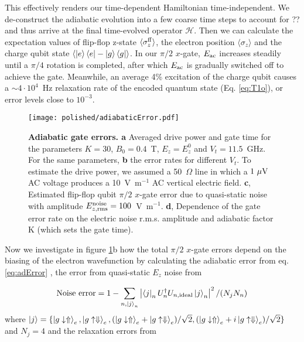 This effectively renders our time-dependent Hamiltonian time-independent. We de-construct the adiabatic evolution into a few coarse time steps to account for ?? and thus arrive at the final time-evolved operator $\mathcal{H}$. Then we can calculate the expectation values of flip-flop z-state $\langle \sigma_z^{\rm ff}\rangle$, the electron position $\langle \sigma_z\rangle$ and the charge qubit state $\langle \ket{e}\bra{e}-\ket{g}\bra{g}\rangle$. 
In our $\pi/2$ $x$-gate, $E_{\rm ac}$ increases steadily until a $\pi/4$ rotation is completed, after which $E_{\rm ac}$ is gradually switched off to achieve the gate. Meanwhile, an average 4\% excitation of the charge qubit causes a $\sim4\cdot 10^4$~Hz relaxation rate of the encoded quantum state (Eq. \ref{eq:T1o}), or error levels close to $10^{-3}$. 

\begin{figure}[h]
	\centering
	\texttt{[image: polished/adiabaticError.pdf]}
	\caption[Adiabatic gate errors]{\textbf{Adiabatic gate errors. a} Averaged drive power and gate time for the parameters $K=30$, $B_0=0.4$~T, $E_z=E_z^0$ and $V_t=11.5$~GHz. For the same parameters, \textbf{b} the error rates for different $V_t$. To estimate the drive power, we assumed a 50~$\Omega$ line in which a $1~{ \mu \rm V}$ AC voltage produces a 10~V~m$^{-1}$ AC vertical electric field.
		\textbf{c}, Estimated flip-flop qubit $\pi/2$ $x$-gate error due to quasi-static noise with amplitude $E_{z, \rm rms}^{\rm noise}=100$~V~m$^{-1}$.
		\textbf{d}, Dependence of the gate error rate on the electric noise r.m.s. amplitude and adiabatic factor K (which sets the gate time).}
	\label{fig:adError}
\end{figure}

Now we investigate in figure \ref{fig:adError}b how the total $\pi/2$ $x$-gate errors depend on the biasing of the electron wavefunction by calculating the adiabatic error from eq. \eqref{eq:adError} , the error from quasi-static $E_z$ noise from
 
\begin{equation}\label{eq:noiseError}
{\rm Noise~error}=1-\sum\limits_{n,\ket{j}_n}{\left|\bra{j}_nU_n^\dagger U_{n,\rm ideal}\ket{j}_n\right|^2/(N_jN_n)}
\end{equation}
where $\ket{j}=\{\ket{g\downarrow\Uparrow}_e,\ket{g\uparrow\Downarrow}_e,(\ket{g\downarrow\Uparrow}_e+\ket{g\uparrow\Downarrow}_e)/\sqrt{2},(\ket{g\downarrow\Uparrow}_e+i\ket{g\uparrow\Downarrow}_e)/\sqrt{2}\}$ and $N_j=4$
and the relaxation errors from 

